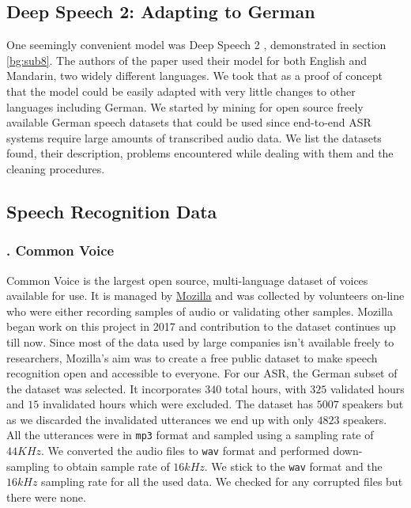 \subsection{Deep Speech 2: Adapting to German}
\label{meth:s2_sub3}

One seemingly convenient model was Deep Speech 2 \cite{amodei2016deep}, demonstrated in section \ref{bg:sub8}. The authors of the paper used their model for both English and Mandarin, two widely different languages. We took that as a proof of concept that the model could be easily adapted with very little changes to other languages including German. We started by mining for open source freely available German speech datasets that could be used since end-to-end \ac{ASR} systems require large amounts of transcribed audio data. We list the datasets found, their description, problems encountered while dealing with them and the cleaning procedures.


\subsection{Speech Recognition Data}
\label{meth:s2_sub4}

\subsubsection{. Common Voice}
\label{meth:s2_sub4_subsub1}

Common Voice is the largest open source, multi-language dataset of voices available for use. It is managed by \href{https://www.mozilla.org/en-US/}{Mozilla} and was collected by volunteers on-line who were either recording samples of audio or validating other samples. Mozilla began work on this project in 2017 and contribution to the dataset continues up till now. Since most of the data used by large companies isn't available freely to researchers, Mozilla's aim was to create a free public dataset to make speech recognition open and accessible to everyone.
For our \ac{ASR}, the German subset of the dataset was selected. It incorporates $340$ total hours, with $325$ validated hours and $15$ invalidated hours which were excluded. The dataset has $5007$ speakers but as we discarded the invalidated utterances we end up with only $4823$ speakers. 
All the utterances were in \texttt{mp3} format and sampled using a sampling rate of $44 KHz$. We converted the audio files to \texttt{wav} format and performed down-sampling to obtain sample rate of $16 kHz$. We stick to the \texttt{wav} format and the $16 kHz$ sampling rate for all the used data. We checked for any corrupted files but there were none.


